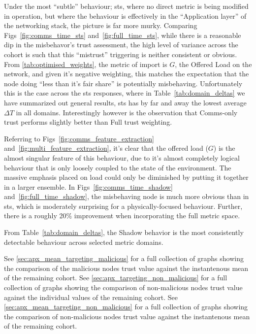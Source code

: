 Under the most ``subtle'' behaviour; \gls{sts}, where no direct metric is being modified in operation, but where the behaviour is effectively in the ``Application layer'' of the networking stack, the picture is far more murky. 
Comparing Figs~\ref{fig:comms_time_sts} and~\ref{fig:full_time_sts}, while there is a reasonable dip in the misbehavor's trust assessment, the high level of variance across the cohort is such that this ``mistrust'' triggering is neither consistent or obvious. 
From \autoref{tab:optimised_weights}, the metric of import is $G$, the Offered Load on the network, and given it's negative weighting, this matches the expectation that the node doing ``less than it's fair share'' is potentially misbehaving. 
Unfortunately this is the case across the \gls{sts} responses, where in Table~\ref{tab:domain_deltas} we have summarized out general results, \gls{sts} has by far and away the lowest average $\Delta T$ in all domains. 
Interestingly however is the observation that Comms-only trust performs slightly better than Full trust weighting.

Referring to Figs~\ref{fig:comms_feature_extraction} and~\autoref{fig:multi_feature_extraction}, it's clear that the offered load ($G$) is the almost singular feature of this behaviour, due to it's almost completely logical behaviour that is only loosely coupled to the state of the environment. 
The massive emphasis placed on load could only be diminished by putting it together in a larger ensemble.
In Figs~\ref{fig:comms_time_shadow} and~\ref{fig:full_time_shadow}, the misbehaving node is much more obvious than in \gls{sts}, which is moderately surprising for a physically-focused behaviour. Further, there is a roughly 20\% improvement when incorporating the full metric space.

From Table~\ref{tab:domain_deltas}, the Shadow behavior is the most consistently detectable behaviour across selected metric domains. 


See \autoref{sec:apx_mean_targeting_malicious} for a full collection of graphs showing the comparison of the malicious nodes trust value against the instantenous mean of the remaining cohort.
See \autoref{sec:apx_targeting_non_malicious} for a full collection of graphs showing the comparison of non-malicious nodes trust value against the individual values of the remaining cohort.
See \autoref{sec:apx_mean_targeting_non_malicious} for a full collection of graphs showing the comparison of non-malicious nodes trust value against the instantenous mean of the remaining cohort.


